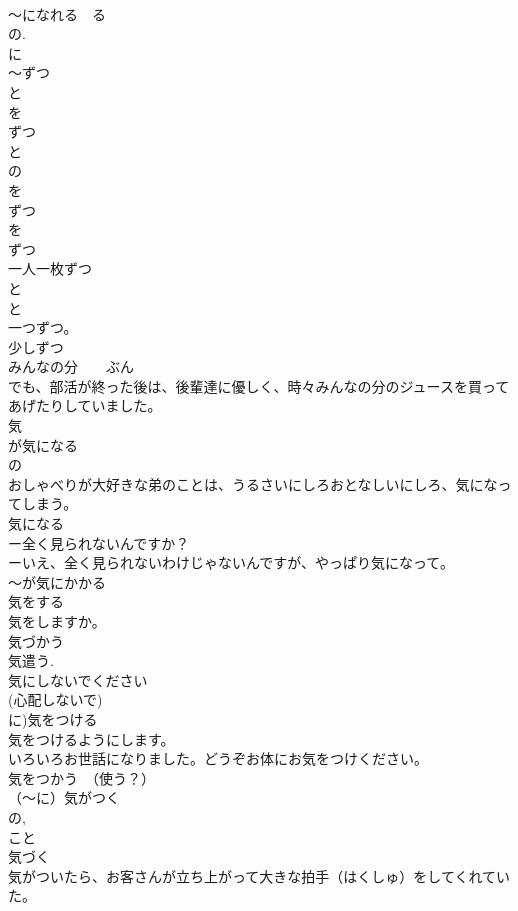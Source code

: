 \documentclass[8pt]{extreport}
\begin{document}
\begin{CJK}{UTF8}{min}
\\	～になれる　る
\\	の.
\\	に 
\\	～ずつ
\\	と
\\	を
\\	ずつ
\\	と
\\	の
\\	を
\\	ずつ
\\	を
\\	ずつ
\\	一人一枚ずつ
\\	と
\\	と
\\	一つずつ。　　
\\	少しずつ　　
\\	みんなの分　　ぶん
\\	でも、部活が終った後は、後輩達に優しく、時々みんなの分のジュースを買ってあげたりしていました。
\\	気
\\	が気になる
\\	の
\\	おしゃべりが大好きな弟のことは、うるさいにしろおとなしいにしろ、気になってしまう。
\\	気になる
\\	ー全く見られないんですか？ 
\\	ーいえ、全く見られないわけじゃないんですが、やっぱり気になって。 
\\	～が気にかかる
\\	気をする
\\	気をしますか。　
\\	気づかう　
\\	気遣う.
\\	気にしないでください
\\	(心配しないで)
\\	に)気をつける
\\	気をつけるようにします。
\\	いろいろお世話になりました。どうぞお体にお気をつけください。 
\\	気をつかう　（使う？）
\\	（～に）気がつく
\\	の, 
\\	こと
\\	気づく　
\\	気がついたら、お客さんが立ち上がって大きな拍手（はくしゅ）をしてくれていた。

\end{CJK}
\end{document}
